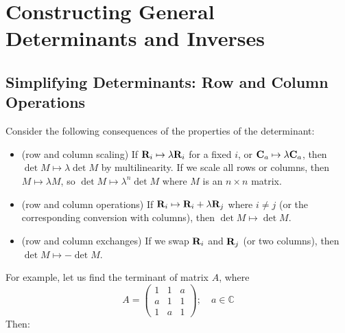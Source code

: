 \documentclass{article}
\begin{document}
\section{Constructing General Determinants and Inverses}
\subsection{Simplifying Determinants: Row and Column Operations}
Consider the following consequences of the properties of the determinant:
\begin{itemize}
	\item (row and column scaling) If $\vb R_i \mapsto \lambda \vb R_i$ for a fixed $i$, or $\vb C_a \mapsto \lambda \vb C_a$, then $\det M \mapsto \lambda \det M$ by multilinearity. If we scale all rows or columns, then $M \mapsto \lambda M$, so $\det M \mapsto \lambda^n \det M$ where $M$ is an $n \times n$ matrix.
	\item (row and column operations) If $\vb R_i \mapsto \vb R_i + \lambda \vb R_j$ where $i \neq j$ (or the corresponding conversion with columns), then $\det M \mapsto \det M$.
	\item (row and column exchanges) If we swap $\vb R_i$ and $\vb R_j$ (or two columns), then $\det M \mapsto -\det M$.
\end{itemize}
For example, let us find the terminant of matrix $A$, where
\[ A = \begin{pmatrix}
		1 & 1 & a \\ a & 1 & 1 \\ 1 & a & 1
	\end{pmatrix};\quad a \in \mathbb C \]
Then:
\end{document}
